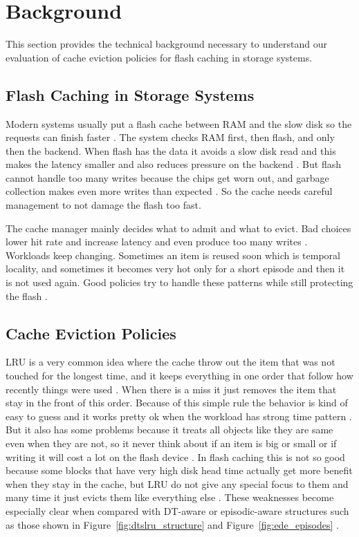 \documentclass[sigconf]{acmart}
\begin{document}
\clearpage
\section{Background}
This section provides the technical background necessary to understand our evaluation of cache eviction policies for flash caching in storage systems.

\subsection{Flash Caching in Storage Systems}
Modern systems usually put a flash cache between RAM and the slow disk so the requests can finish faster \cite{wong2024baleen, Yang2022CacheSack}. The system checks RAM first, then flash, and only then the backend. When flash has the data it avoids a slow disk read and this makes the latency smaller and also reduces pressure on the backend \cite{Oh2010CachingLess}. But flash cannot handle too many writes because the chips get worn out, and garbage collection makes even more writes than expected \cite{Wang2020AustereCache}. So the cache needs careful management to not damage the flash too fast.

The cache manager mainly decides what to admit and what to evict. Bad choices lower hit rate and increase latency and even produce too many writes \cite{li2016cachededup, shen2016cloudcache}. Workloads keep changing. Sometimes an item is reused soon which is temporal locality, and sometimes it becomes very hot only for a short episode and then it is not used again. Good policies try to handle these patterns while still protecting the flash \cite{mcallister2024fairywren, lerasle2015emrc, liu2020maperx}.

\subsection{Cache Eviction Policies}
LRU is a very common idea where the cache throw out the item that was not touched for the longest time, and it keeps everything in one order that follow how recently things were used \cite{Oh2010CachingLess}. When there is a miss it just removes the item that stay in the front of this order. Because of this simple rule the behavior is kind of easy to guess and it works pretty ok when the workload has strong time pattern \cite{lerasle2015emrc}. But it also has some problems because it treats all objects like they are same even when they are not, so it never think about if an item is big or small or if writing it will cost a lot on the flash device \cite{liu2020maperx}. In flash caching this is not so good because some blocks that have very high disk head time actually get more benefit when they stay in the cache, but LRU do not give any special focus to them and many time it just evicts them like everything else \cite{wong2024baleen}. These weaknesses become especially clear when compared with DT-aware or episodic-aware structures such as those shown in Figure~\ref{fig:dtslru_structure} and Figure~\ref{fig:ede_episodes} \cite{Yang2022CacheSack}.
\end{document}
